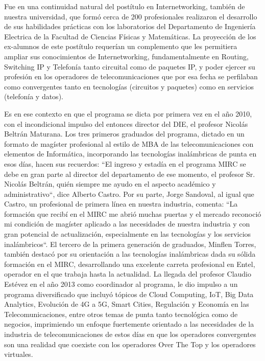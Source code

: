 Fue en una continuidad natural del postítulo en Internetworking, también de nuestra universidad, que formó cerca de 200 profesionales realizaron el desarrollo de sus habilidades prácticas con los laboratorios del Departamento de Ingeniería Electrica de la Facultad de Ciencias Físicas y Matemáticas. La proyección de los ex-alumnos de este postítulo requerían un complemento que les permitiera ampliar sus conocimientos de Internetworking, fundamentalmente en Routing, Switching IP y Telefonía tanto circuital como de paquetes IP, y poder ejercer su profesión en los operadores de telecomunicaciones que por esa fecha se perfilaban como convergentes tanto en tecnologías (circuitos y paquetes) como en servicios (telefonía y datos).

Es en ese contexto en que el programa se dicta por primera vez en el año 2010, con el incondicional impulso del entonces director del DIE, el profesor Nicolás Beltrán Maturana. Los tres primeros graduados del programa, dictado en un formato de magíster profesional al estilo de MBA de las telecomunicaciones con elementos de Informática, incorporando las tecnologías inalámbricas de punta en esos días, hacen sus recuerdos: “El ingreso y estadía en el programa MIRC se debe en gran parte al director del departamento de ese momento, el profesor Sr. Nicolás Beltrán, quién siempre me ayudo en el aspecto académico y administrativo“, dice Alberto Castro. Por su parte, Jorge Sandoval, al igual que Castro, un profesional de primera línea en nuestra industria, comenta: “La formación que recibí en el MIRC me abrió muchas puertas y el mercado reconoció mi condición de magíster aplicado a las necesidades de nuestra industria y con gran potencial de actualización, especialmente en las tecnologías y los servicios inalámbricos“. El tercero de la primera generación de graduados, Minflen Torres, también destacó por su orientación a las tecnologías inalámbricas dada su sólida formación en el MIRC, desarrollando una excelente carreta profesional en Entel, operador en el que trabaja hasta la actualidad.
La llegada del profesor Claudio Estévez en el año 2013 como coordinador al programa, le dio impulso a un programa diversificado que incluyó tópicos de Cloud Computing, IoT, Big Data Analytics, Evolución de 4G a 5G, Smart Cities, Regulación y Economía en las Telecomunicaciones, entre otros  temas de punta tanto tecnológica como de negocios, imprimiendo un enfoque fuertemente orientado a las necesidades de la industria de telecomunicaciones de estos días en que los operadores convergentes son una realidad que coexiste con los operadores Over The Top y los operadores virtuales.

